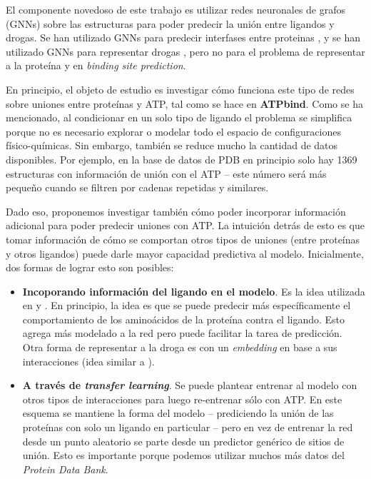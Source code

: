 \documentclass[
    left=2.0cm,         %
    right=2.0cm,        %
    top=2.0cm,          %
    bottom=2.5cm,         %
    bindingoffset=6mm,  %
    nohyphenation=false %
]{eiti/eiti-thesis}
\begin{document}
El componente novedoso de este trabajo es utilizar redes neuronales de grafos (GNNs) sobre
las estructuras para poder predecir la unión entre ligandos y drogas. Se han utilizado
GNNs para predecir interfases entre proteinas \cite{fout2017proteininterface}, y se han 
utilizado GNNs para representar drogas \cite{tsubaki2018CPIgnn}, pero no para el problema 
de representar a la proteína y en \textit{binding site prediction}. 

En principio, el objeto de estudio es investigar cómo funciona este tipo de redes
sobre uniones entre proteínas y ATP, tal como se hace en \textbf{ATPbind}\cite{atpbind}.
Como se ha mencionado, al condicionar en un solo tipo de ligando el problema se
simplifica porque no es necesario explorar o modelar todo el espacio de configuraciones 
físico-químicas.
Sin embargo, también se reduce mucho la cantidad de datos disponibles. Por ejemplo,
en la base de datos de PDB en principio solo hay 1369 estructuras con información de 
unión con el ATP -- este número será más pequeño cuando se filtren por cadenas
repetidas y similares.

Dado eso, proponemos investigar también cómo poder incorporar información adicional
para poder predecir uniones con ATP. La intuición detrás de esto es que tomar información
de cómo se comportan otros tipos de uniones (entre proteínas y otros ligandos) puede darle
mayor capacidad predictiva al modelo. Inicialmente, dos formas de lograr esto son posibles:   

\begin{itemize}
    \item \textbf{Incoporando información del ligando en el modelo}. Es la idea utilizada en
    \cite{tsubaki2018CPIgnn} y \cite{yang2013tmsite}. En principio, la idea es que se puede
    predecir más específicamente el comportamiento de los aminoácidos de la proteína
    contra el ligando. Esto agrega más modelado a la red pero puede facilitar la tarea de
    predicción. Otra forma de representar a la droga es
    con un \textit{embedding} en base a sus interacciones (idea similar a 
    \cite{keiser2009newtargetsknowndrugs}).
    \item \textbf{A través de \textit{transfer learning}}. Se puede plantear entrenar
    al modelo con otros tipos de interacciones para luego re-entrenar sólo con ATP.
    En este esquema se mantiene la forma del modelo -- prediciendo la unión de las proteínas con solo un ligando en particular -- pero en vez de entrenar la red desde un punto aleatorio se 
    parte desde un predictor genérico de sitios de unión. Esto es importante porque
    podemos utilizar muchos más datos del \textit{Protein Data Bank}. 
\end{itemize}
\end{document}
